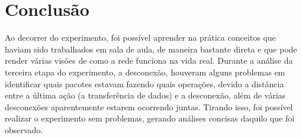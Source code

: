\documentclass{article}
\begin{document}
\section{Conclusão}

Ao decorrer do experimento, foi possível aprender na prática conceitos que haviam sido trabalhados em sala de aula, de maneira bastante direta e que pode render várias visões de como a rede funciona na vida real. Durante a análise da terceira etapa do experimento, a desconexão, houveram alguns problemas em identificar quais pacotes estavam fazendo quais operações, devido a distância entre a última ação (a transferência de dados) e a desconexão, além de várias desconexões aparentemente estarem ocorrendo juntas. Tirando isso, foi possível realizar o experimento sem problemas, gerando análises concisas daquilo que foi observado.
\end{document}
